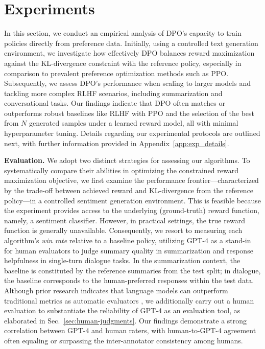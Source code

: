 \section{Experiments}
In this section, we conduct an empirical analysis of DPO's capacity to train policies directly from preference data. Initially, using a controlled text generation environment, we investigate how effectively DPO balances reward maximization against the KL-divergence constraint with the reference policy, especially in comparison to prevalent preference optimization methods such as PPO. Subsequently, we assess DPO’s performance when scaling to larger models and tackling more complex RLHF scenarios, including summarization and conversational tasks. Our findings indicate that DPO often matches or outperforms robust baselines like RLHF with PPO and the selection of the best from $N$ generated samples under a learned reward model, all with minimal hyperparameter tuning. Details regarding our experimental protocols are outlined next, with further information provided in Appendix~\ref{app:exp_details}.

\textbf{Evaluation.} We adopt two distinct strategies for assessing our algorithms. To systematically compare their abilities in optimizing the constrained reward maximization objective, we first examine the performance frontier—characterized by the trade-off between achieved reward and KL-divergence from the reference policy—in a controlled sentiment generation environment. This is feasible because the experiment provides access to the underlying (ground-truth) reward function, namely, a sentiment classifier. However, in practical settings, the true reward function is generally unavailable. Consequently, we resort to measuring each algorithm’s \textit{win rate} relative to a baseline policy, utilizing GPT-4 as a stand-in for human evaluators to judge summary quality in summarization and response helpfulness in single-turn dialogue tasks. In the summarization context, the baseline is constituted by the reference summaries from the test split; in dialogue, the baseline corresponds to the human-preferred responses within the test data. Although prior research indicates that language models can outperform traditional metrics as automatic evaluators \citep{Chen2023ExploringTU}, we additionally carry out a human evaluation to substantiate the reliability of GPT-4 as an evaluation tool, as elaborated in Sec.~\ref{sec:human-judgments}. Our findings demonstrate a strong correlation between GPT-4 and human raters, with human-to-GPT-4 agreement often equaling or surpassing the inter-annotator consistency among humans.

